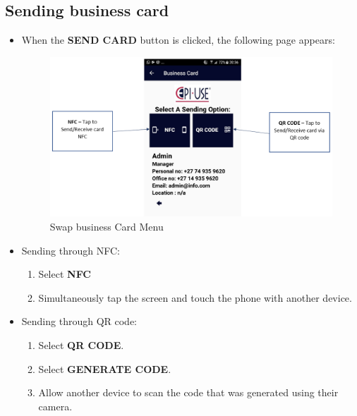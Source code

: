 \documentclass[english]{article}
\begin{document}
	\subsection{Sending business card}
		\begin{itemize}
		\item When the \textbf{SEND CARD} button is clicked, the following page appears:
		
		\begin{figure}[H]
			\centering
			\includegraphics[scale=0.7]{swap_info.png}
			\caption{Swap business Card Menu}
			\label{figure: 5}
		\end{figure}
		
		\item Sending through NFC:
		\begin{enumerate}
			\item Select \textbf{NFC}
			\item Simultaneously tap the screen and touch the phone with another device.
		\end{enumerate}

		\item Sending through QR code:
		\begin{enumerate}
			\item Select \textbf{QR CODE}.
			\item Select \textbf{GENERATE CODE}.
			\item Allow another device to scan the code that was generated using their camera.
		\end{enumerate}
	\end{itemize}
\end{document}
